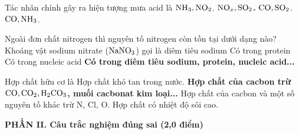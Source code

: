 \documentclass[11pt,a4paper]{article}
\begin{document}
\begin{ex}
Tác nhân chính gây ra hiện tượng mưa acid là
\choice
{$\ce{NH3}, \ce{NO2}$.}
{{\textbf{\color{hfRed}$\ce{NO_x}, \ce{SO2}$.}}}
{$\ce{CO}, \ce{SO2}$.}
{$\ce{CO}, \ce{NH3}$.}
\end{ex}
\begin{ex}
Ngoài đơn chất nitrogen thì nguyên tố nitrogen còn tồn tại dưới dạng nào?
\choice
{Khoáng vật sodium nitrate ($\ce{NaNO3}$) gọi là diêm tiêu sodium}
{Có trong protein}
{Có trong nucleic acid}
{{\textbf{\color{hfRed}Có trong diêm tiêu sodium, protein, nucleic acid...}}}
\end{ex}
\begin{ex}
Hợp chất hữu cơ là
\choice
{Hợp chất khó tan trong nước.}
{{\textbf{\color{hfRed}Hợp chất của cacbon trừ $\ce{CO}, \ce{CO2}, \ce{H2CO3}$, muối cacbonat kim loại...}}}
{Hợp chất của cacbon và một số nguyên tố khác trừ N, Cl, O.}
{Hợp chất có nhiệt độ sôi cao.}
\end{ex}

\vspace{6pt}
{\large\bfseries\color{mainGreen} PHẦN II. Câu trắc nghiệm đúng sai (2,0 điểm)}
\end{document}
